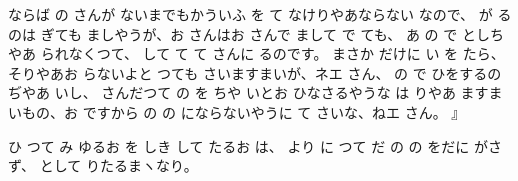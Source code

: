 ならば
の
さんが
ないまでもかういふ
を
て
なけりやあならない
なので、
が
るのは
ぎても
ましやうが、お
さんはお
さんで
まして
で
ても、
あ
の
で
としちやあ
られなくつて、
して
て
て
さんに
るのです。
まさか
だけに
い
を
たら、そりやあお
らないよと
つても
さいますまいが、ネエ
さん、
の
で
ひをするのぢやあ
いし、
さんだつて
の
を
ちや
いとお
ひなさるやうな
は
りやあ
ますまいもの、お
ですから
の
の
にならないやうに
て
さいな、ねエ
さん。
』

ひ
つて
み
ゆるお
を
しき
して
たるお
は、
より
に
つて
だ
の
の
をだに
がさず、
として
りたるまヽなり。

